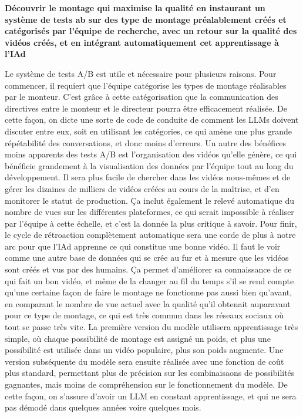 \documentclass[livre]{udes-genie-these}
\begin{document}
{\textbf{Découvrir le montage qui maximise la qualité en instaurant un système de tests ab sur des type de montage préalablement créés et catégorisés par l'équipe de recherche, avec un retour sur la qualité des vidéos créés, et en intégrant automatiquement cet apprentissage à l'IAd}

Le système de tests A/B est utile et nécessaire pour plusieurs raisons. Pour commencer, il requiert que l'équipe catégorise les types de montage réalisables par le monteur. C'est grâce à cette catégorisation que la communication des directives entre le monteur et le directeur pourra être efficacement réalisée. De cette façon, on dicte une sorte de code de conduite de comment les LLMs doivent discuter entre eux, soit en utilisant les catégories, ce qui amène une plus grande répétabilité des conversations, et donc moins d'erreurs.
Un autre des bénéfices moins apparents des tests A/B est l'organisation des vidéos qu'elle génère, ce qui bénéficie grandement à la visualisation des données par l'équipe tout au long du développement. Il sera plus facile de chercher dans les vidéos nous-mêmes et de gérer les dizaines de milliers de vidéos créées au cours de la maîtrise, et d'en monitorer le statut de production. Ça inclut également le relevé automatique du nombre de vues sur les différentes plateformes, ce qui serait impossible à réaliser par l'équipe à cette échelle, et c'est la donnée la plus critique à savoir.
Pour finir, le cycle de rétroaction complètement automatique sera une corde de plus à notre arc pour que l'IAd apprenne ce qui constitue une bonne vidéo. Il faut le voir comme une autre base de données qui se crée au fur et à mesure que les vidéos sont créés et vus par des humains. Ça permet d'améliorer sa connaissance de ce qui fait un bon vidéo, et même de la changer au fil du temps s'il se rend compte qu'une certaine façon de faire le montage ne fonctionne pas aussi bien qu'avant, en comparant le nombre de vue actuel avec la qualité qu'il obtenait auparavant pour ce type de montage, ce qui est très commun dans les réseaux sociaux où tout se passe très vite. La première version du modèle utilisera apprentissage très simple, où chaque possibilité de montage est assigné un poids, et plus une possibilité est utilisée dans un vidéo populaire, plus son poids augmente. Une version subséquente du modèle sera ensuite réalisée avec une fonction de coût plus standard, permettant plus de précision sur les combinaisaons de possibilités gagnantes, mais moins de compréhension sur le fonctionnement du modèle.  De cette façon, on s'assure d'avoir un LLM en constant apprentissage, et qui ne sera pas démodé dans quelques années voire quelques mois.

}
\end{document}
